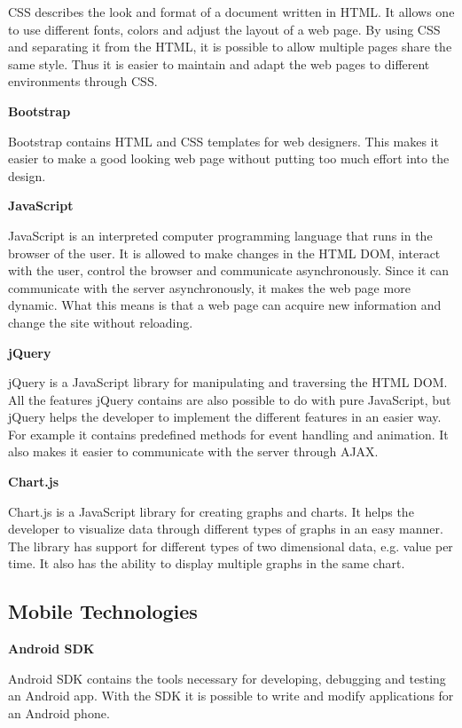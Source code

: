 CSS describes the look and format of a document written in HTML.
It allows one to use different fonts, colors and adjust the layout of a web page.
By using CSS and separating it from the HTML, it is possible to allow multiple pages share the same style.
Thus it is easier to maintain and adapt the web pages to different environments through CSS. \cite{CSS3}

\textbf{Bootstrap}

Bootstrap contains HTML and CSS templates for web designers.
This makes it easier to make a good looking web page without putting too much effort into the design. \cite{Bootstrap}

\textbf{JavaScript}

JavaScript is an interpreted computer programming language that runs in the browser of the user.
It is allowed to make changes in the HTML DOM, interact with the user, control the browser and communicate asynchronously.
Since it can communicate with the server asynchronously, it makes the web page more dynamic.
What this means is that a web page can acquire new information and change the site without reloading. \cite{JavaScript}

\textbf{jQuery}

jQuery is a JavaScript library for manipulating and traversing the HTML DOM.
All the features jQuery contains are also possible to do with pure JavaScript, but jQuery helps the developer to
implement the different features in an easier way.
For example it contains predefined methods for event handling and animation.
It also makes it easier to communicate with the server through AJAX. \cite{jQuery}

\textbf{Chart.js}

Chart.js is a JavaScript library for creating graphs and charts.
It helps the developer to visualize data through different types of graphs in an easy manner.
The library has support for different types of two dimensional data, e.g. value per time.
It also has the ability to display multiple graphs in the same chart.  \cite{Chartjs}

\subsection{Mobile Technologies}

\textbf{Android SDK}

Android SDK contains the tools necessary for developing, debugging and testing an Android app.
With the SDK it is possible to write and modify applications for an Android phone. \cite{AndroidSDK}

